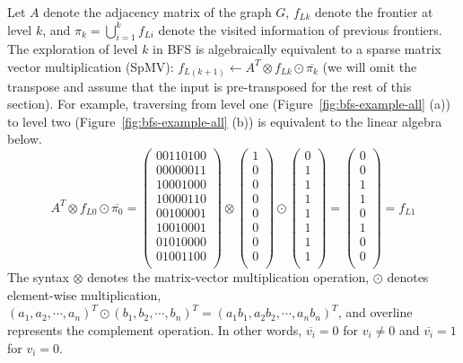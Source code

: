 \documentclass[conference]{IEEEtran}
\begin{document}
Let $A$ denote the adjacency matrix of the graph $G$, $f_{Lk}$ denote the
frontier at level $k$, and $\pi_k = \bigcup^{k}_{i=1}f_{Li}$ denote the
visited information of previous frontiers. The exploration of level $k$ in BFS
is algebraically equivalent to a sparse matrix vector multiplication (SpMV):
$f_{L(k+1)} \gets A^T \otimes f_{Lk} \odot \overline{\pi_k}$ (we will omit the
transpose and assume that the input is pre-transposed for the rest of this
section).
For example, traversing from level one (Figure~\ref{fig:bfs-example-all} (a))
to level two (Figure~\ref{fig:bfs-example-all} (b)) is equivalent to the
linear algebra below.
\[
A^T \otimes f_{L0} \odot \overline{\pi_0} =
 \begin{pmatrix}
   0 0 1 1 0 1 0 0\\
   0 0 0 0 0 0 1 1\\
   1 0 0 0 1 0 0 0\\
   1 0 0 0 0 1 1 0\\
   0 0 1 0 0 0 0 1\\
   1 0 0 1 0 0 0 1\\
   0 1 0 1 0 0 0 0\\
   0 1 0 0 1 1 0 0\\
 \end{pmatrix}
\otimes
 \begin{pmatrix}
   1\\   0\\   0\\   0\\   0\\   0\\   0\\   0\\
 \end{pmatrix}
\odot
 \begin{pmatrix}
   0\\   1\\   1\\   1\\   1\\   1\\   1\\   1\\
 \end{pmatrix}
=
 \begin{pmatrix}
   0\\   0\\   1\\   1\\   0\\   1\\   0\\   0\\
 \end{pmatrix}
= f_{L1}
\]
The syntax $\otimes$ denotes the
matrix-vector multiplication operation, $\odot$ denotes element-wise
multiplication, $(a_1, a_2, \cdots, a_n)^T \odot (b_1, b_2, \cdots, b_n)^T =
(a_1b_1, a_2b_2, \cdots, a_nb_n)^T$, and overline represents the complement
operation. In other words, $\overline{v_i} = 0$ for $v_i \neq 0$ and
$\overline{v_i} = 1$ for $v_i = 0$.
\end{document}
